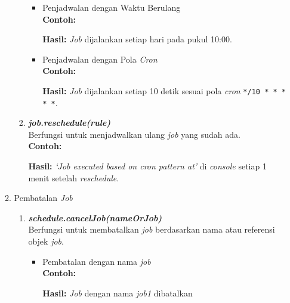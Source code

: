 \begin{enumerate}[label*=\arabic*.,ref=\arabic*]
\begin{enumerate}[label*=\arabic*.,ref=\arabic*]
\begin{enumerate}[label=\alph*.]
\begin{itemize}
                \item Penjadwalan dengan Waktu Berulang\\
                \textbf{Contoh:}
                \vspace{-0.1cm}
                
                \textbf{Hasil:} \textit{Job} dijalankan setiap hari pada pukul 10:00.

                \item Penjadwalan dengan Pola \textit{Cron}\\
                \textbf{Contoh:}
                \vspace{-0.1cm}
                
                \textbf{Hasil:} \textit{Job} dijalankan setiap 10 detik sesuai pola \textit{cron} \texttt{*/10 * * * * *}.
            \end{itemize}
                
            \item \textit{\textbf{job.reschedule(rule)}}\\
                Berfungsi untuk menjadwalkan ulang \textit{job} yang sudah ada.\\
            \textbf{Contoh:}
            \vspace{-0.1cm}
            
            \textbf{Hasil:} \textit{`Job executed based on cron pattern at'} di \textit{console} setiap 1 menit setelah \textit{reschedule}.
                
        \end{enumerate}

        \item Pembatalan \textit{Job}\\
        \begin{enumerate}[label=\alph*.]
            \item \textbf{\textit{schedule.cancelJob(nameOrJob)}}\\
            Berfungsi untuk membatalkan \textit{job} berdasarkan nama atau referensi objek \textit{job}.\\
            \begin{itemize}
                \item Pembatalan dengan nama \textit{job}\\
                \textbf{Contoh:}
                \vspace{-0.1cm}
                
                \textbf{Hasil:} \textit{Job} dengan nama \textit{job1} dibatalkan


\end{itemize}
\end{enumerate}
\end{enumerate}
\end{enumerate}
